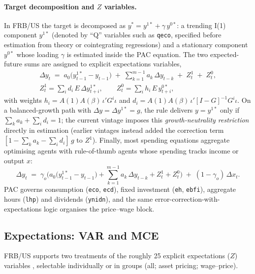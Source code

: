 \paragraph{Target decomposition and $Z$ variables.} In FRB/US the target is decomposed as $y^{*}=y^{1*}+\gamma\,y^{0*}$: a trending I(1) component $y^{1*}$ (denoted by ``Q'' variables such as \texttt{qeco}, specified before estimation from theory or cointegrating regressions) and a stationary component $y^{0*}$ whose loading $\gamma$ is estimated inside the PAC equation. The two expected-future sums are assigned to explicit expectations variables,
\begin{equation}
\begin{gathered}
\Delta y_t \;=\; a_0\big(y^{1*}_{t-1}-y_{t-1}\big) \;+\; \sum_{k=1}^{m-1} a_k\,\Delta y_{t-k} \;+\; Z^{1}_t \;+\; Z^{0}_t,\\
Z^{1}_t = \sum_{i} d_i\, E\,\Delta y^{1*}_{t+i},\qquad Z^{0}_t = \sum_i h_i\, E\, y^{0*}_{t+i},
\end{gathered}
\label{eq:pac-z}
\end{equation}
with weights $h_i = A(1)A(\beta)\,\iota' G^{i}\iota$ and $d_i = A(1)A(\beta)\,\iota'[I-G]^{-1}G^{i}\iota$. On a balanced-growth path with $\Delta y=\Delta y^{1*}=g$, the rule delivers $y=y^{1*}$ only if $\sum_k a_k + \sum_i d_i = 1$; the current vintage imposes this \emph{growth-neutrality restriction} directly in estimation (earlier vintages instead added the correction term $[1-\sum_k a_k-\sum_i d_i]\,g$ to $Z^1$). Finally, most spending equations aggregate optimising agents with rule-of-thumb agents whose spending tracks income or output $x$:
\begin{equation}
\Delta y_t \;=\; \gamma_{\!o}\Big(a_0\big(y^{1*}_{t-1}-y_{t-1}\big)+\sum_{k=1}^{m-1}a_k\,\Delta y_{t-k}+Z^{1}_t+Z^{0}_t\Big) \;+\; (1-\gamma_{\!o})\,\Delta x_t .
\label{eq:pac-mix}
\end{equation}
PAC governs consumption (\texttt{eco}, \texttt{ecd}), fixed investment (\texttt{eh}, \texttt{ebfi}), aggregate hours (\texttt{lhp}) and dividends (\texttt{ynidn}), and the same error-correction-with-expectations logic organises the price--wage block.

\subsection{Expectations: VAR and MCE}
\label{sec:expectations}

FRB/US supports two treatments of the roughly 25 explicit expectations ($Z$) variables \citep{brayton1997role, brayton2014note}, selectable individually or in groups (all; asset pricing; wage--price).

